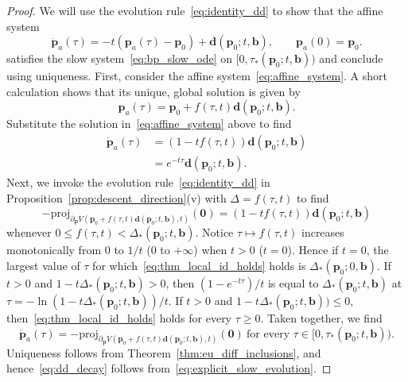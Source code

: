 \documentclass[10pt,a4paper]{amsart}
\def\bb {\boldsymbol{b}}
\def\bd {\boldsymbol{d}}
\def\bp {\boldsymbol{p}}
\def\bpa {\bp_{a}}
\def\bpo {\bp_{0}}
\def\proj {\mathrm{proj}}
\begin{document}
\begin{proof}
We will use the evolution rule~\eqref{eq:identity_dd} to show that the affine system
\begin{equation}\label{eq:affine_system}
    \dot{\bp}_{a}(\tau) =-t(\bpa(\tau) - \bpo) + \bd(\bpo;t,\bb), \qquad \bpa(0) = \bpo.
\end{equation}
satisfies the slow system~\eqref{eq:bp_slow_ode} on $[0,\tau_{*}(\bpo;t,\bb))$ and conclude using uniqueness. First, consider the affine system~\eqref{eq:affine_system}. A short calculation shows that its unique, global solution is given by 
\[
\bpa(\tau) = \bpo + f(\tau,t)\bd(\bpo;t,\bb).
\]
Substitute the solution in~\eqref{eq:affine_system} above to find
\begin{equation}\label{eq:explicit_slow_evolution}
\begin{alignedat}{1}
\dot{\bp}_{a}(\tau) &= (1-tf(\tau,t))\bd(\bpo;t,\bb) \\
&= e^{-t\tau}\bd(\bpo;t,\bb).
\end{alignedat}
\end{equation}
Next, we invoke the evolution rule~\eqref{eq:identity_dd} in Proposition~\ref{prop:descent_direction}(v) with $\Delta = f(\tau,t)$ to find
\begin{equation}\label{eq:thm_local_id_holds}
-\proj_{\partial_{\bp} V(\bpo + f(\tau,t)\bd(\bpo;t,\bb),t)}(\boldsymbol{0}) = (1-tf(\tau,t))\bd(\bpo;t,\bb)
\end{equation}
whenever $0 \leqslant f(\tau,t) < \Delta_{*}(\bpo;t,\bb)$. Notice $\tau \mapsto f(\tau,t)$ increases monotonically from $0$ to $1/t$ (0 to $+\infty$) when $t > 0$ ($t = 0$). Hence if $t = 0$, the largest value of $\tau$ for which~\eqref{eq:thm_local_id_holds} holds is $\Delta_{*}(\bpo;0,\bb)$. If $t > 0$ and $1-t\Delta_{*}(\bpo;t,\bb) > 0$, then $(1-e^{-t\tau})/t$ is equal to $\Delta_{*}(\bpo;t,\bb)$ at $\tau = -\ln\left(1-t\Delta_{*}(\bpo;t,\bb)\right)/t$. If $t > 0$ and $1 - t\Delta_{*}(\bpo;t,\bb)) \leqslant 0$, then~\eqref{eq:thm_local_id_holds} holds for every $\tau \geqslant 0$. Taken together, we find 
\[
\dot{\bp}_{a}(\tau) = -\proj_{\partial_{\bp} V(\bpo + f(\tau,t)\bd(\bpo;t,\bb),t)}(\boldsymbol{0}) \ \text{for every $\tau \in [0,\tau_{*}(\bpo;t,\bb))$}.
\]
Uniqueness follows from Theorem~\ref{thm:eu_diff_inclusions}, and hence~\eqref{eq:dd_decay} follows from~\eqref{eq:explicit_slow_evolution}.
\end{proof}
\end{document}
